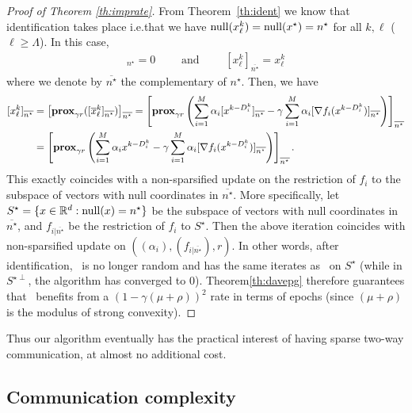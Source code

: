 \begin{proof}[Proof of Theorem \ref{th:imprate}]
From Theorem~\ref{th:ident} we know that identification takes place i.e.\;that we have $\mathrm{null}(x^{k}_{\ell}) = \mathrm{null}(x^{\star}) = n^{\star}$ for all $k,\ell$ ($\ell\geq\Lambda$).
In this case, 
\begin{align*}
    [x^k_{\ell}]_{n^{\star}} = 0 \qquad\text{ and }\qquad[x^k_{\ell}]_{\overline{n^{\star}}} = x_{\ell}^k
\end{align*}
where we denote by $\overline{n^{\star}}$ the complementary of $n^{\star}$. Then, we have
\begin{align*}
  \nonumber   [x^k_\ell]_{\overline{n^\star}}  
  &=\left[\mathbf{prox}_{\gamma r}([\overline{x}^k_\ell]_{\overline{n^\star}})\right]_{\overline{n^\star}}  
  = \left[\mathbf{prox}_{\gamma r}\left(\sum_{i=1}^M \alpha_i [x^{k-D_i^k}]_{\overline{n^\star}} - \gamma \sum_{i=1}^M \alpha_i [\nabla f_i(x^{k-D_i^k})]_{\overline{n^\star}} \right)\right]_{\overline{n^\star}} \\
     &=  \left[\mathbf{prox}_{\gamma r}\left(\sum_{i=1}^M \alpha_i x^{k-D_i^k} - \gamma \sum_{i=1}^M \alpha_i [\nabla f_i(x^{k-D_i^k})]_{\overline{n^\star}} \right)\right]_{\overline{n^\star}}.
\end{align*}
This exactly coincides with a non-sparsified update on the restriction of $f_i$ to the subspace of vectors with null coordinates in ${\overline{n^\star}}$. More specifically, let $S^\star = \{ x\in \mathbb{R}^d : \mathrm{null}(x) = n^\star \}$ be the subspace of vectors with null coordinates in ${\overline{n^\star}}$, and
$f_{i|{\overline{n^\star}}}$ be the restriction of $f_i$ to $S^\star$.
Then the above iteration coincides with non-sparsified update on
$((\alpha_i),(f_{i|{\overline{n^\star}}}),r)$. In other words, after identification, \spyI~is no longer random and has the same iterates as \dave~on $S^\star$ (while in $S^{\star\perp}$, the algorithm has converged to $0$). Theorem\;\ref{th:davepg} therefore guarantees that \spyI~benefits from a $(1-\gamma (\mu+\rho))^2$ rate in terms of epochs (since $(\mu+\rho)$ is the modulus of strong convexity).

\end{proof}

Thus our algorithm eventually has the practical interest of having sparse two-way communication, at almost no additional cost.

\subsection{Communication complexity}\label{sec:comm}

